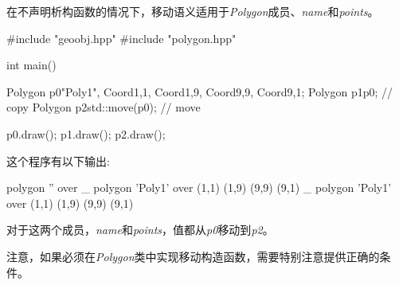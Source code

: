 在不声明析构函数的情况下，移动语义适用于\textit{Polygon}成员、\textit{name}和\textit{points}。

\begin{cppcode}
#include "geoobj.hpp"
#include "polygon.hpp"

int main()
{
	Polygon p0{"Poly1", {Coord{1,1}, Coord{1,9}, Coord{9,9}, Coord{9,1}}};
	Polygon p1{p0}; // copy
	Polygon p2{std::move(p0)}; // move
	
	p0.draw();
	p1.draw();
	p2.draw();
}
\end{cppcode}

这个程序有以下输出:

\begin{shell}
polygon '' over _
polygon 'Poly1' over (1,1) (1,9) (9,9) (9,1) _
polygon 'Poly1' over (1,1) (1,9) (9,9) (9,1) 
\end{shell}

对于这两个成员，\textit{name}和\textit{points}，值都从\textit{p0}移动到\textit{p2}。

注意，如果必须在\textit{Polygon}类中实现移动构造函数，需要特别注意提供正确的条件。



























































